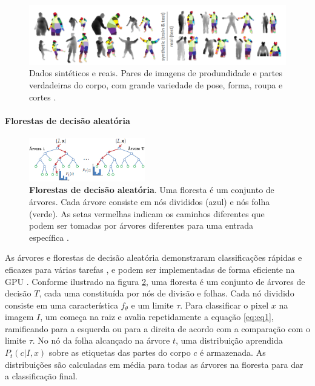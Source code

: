 \begin{figure}[ht]
\centering
\includegraphics[resolution=300,width=1.0\textwidth,natwidth=610,natheight=642]{images/body_parts.png}
    \caption{Dados sintéticos e reais. Pares de imagens de produndidade e partes verdadeiras do corpo, com grande variedade de pose, forma, roupa e cortes \cite{Shotton:2013:RHP:2398356.2398381}.}
    \label{fig:bodyparts}
\end{figure}

\paragraph{Florestas de decisão aleatória }\label{sec:forests}

\begin{figure}[ht]
\centering
\includegraphics[resolution=300,width=0.45\textwidth,natwidth=610,natheight=642]{images/tree_decision.png}
    \caption{\textbf{Florestas de decisão aleatória}. Uma floresta é um conjunto de árvores. Cada árvore consiste em nós divididos (azul) e nós folha (verde). As setas vermelhas indicam os caminhos diferentes que podem ser tomadas por árvores diferentes para uma entrada específica \cite{Shotton:2013:RHP:2398356.2398381}.}
    \label{fig:decisionTree}
\end{figure}

As árvores e florestas de decisão aleatória \cite{quinlan1986induction, shepherd1983appraisal, amit1997shape, breiman2001random} demonstraram classificações rápidas e eficazes para várias tarefas \cite{lepetit2005randomized, moosmann2007fast, shotton2008semantic}, e podem ser implementadas de forma eficiente na GPU \cite{sharp2008implementing}. Conforme ilustrado na figura \ref{fig:decisionTree}, uma floresta é um conjunto de árvores de decisão $T$, cada uma constituída por nós de divisão e folhas. Cada nó dividido consiste em uma característica ${f_{\theta}}$ e um limite $\tau$. Para classificar o pixel $x$ na imagem $I$, um começa na raiz e avalia repetidamente a equação \ref{eq:eq1}, ramificando para a esquerda ou para a direita de acordo com a comparação com o limite $\tau$. No nó da folha alcançado na árvore $t$, uma distribuição aprendida $P_{t} (c | I, x)$ sobre as etiquetas das partes do corpo $c$ é armazenada. As distribuições são calculadas em média para todas as árvores na floresta para dar a classificação final.

